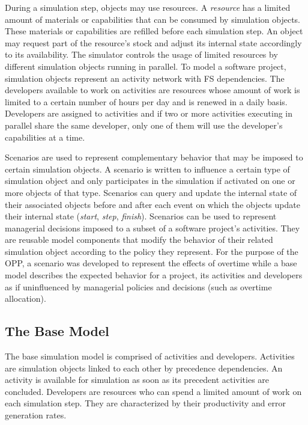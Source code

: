 \documentclass[conference]{IEEEtran}
\begin{document}
During a simulation step, objects may use resources. A {\it resource} has a limited amount of materials or capabilities that can be consumed by simulation objects. These materials or capabilities are refilled before each simulation step. An object may request part of the resource's stock and adjust its internal state accordingly to its availability. The simulator controls the usage of limited resources by different simulation objects running in parallel. To model a software project, simulation objects represent an activity network with FS dependencies. The developers available to work on activities are resources whose amount of work is limited to a certain number of hours per day and is renewed in a daily basis. Developers are assigned to activities and if two or more activities executing in parallel share the same developer, only one of them will use the developer's capabilities at a time.

Scenarios are used to represent complementary behavior that may be imposed to certain simulation objects. A scenario is written to influence a certain type of simulation object and only participates in the simulation if activated on one or more objects of that type. Scenarios can query and update the internal state of their associated objects before and after each event on which the objects update their internal state ({\it start}, {\it step}, {\it finish}). Scenarios can be used to represent managerial decisions imposed to a subset of a software project's activities. They are reusable model components that modify the behavior of their related simulation object according to the policy they represent. For the purpose of the OPP, a scenario was developed to represent the effects of overtime while a base model describes the expected behavior for a project, its activities and developers as if uninfluenced by managerial policies and decisions (such as overtime allocation).

\subsection{The Base Model}
The base simulation model is comprised of activities and developers. Activities are simulation objects linked to each other by precedence dependencies. An activity is available for simulation as soon as its precedent activities are concluded. Developers are resources who can spend a limited amount of work on each simulation step. They are characterized by their productivity and error generation rates.
\end{document}
